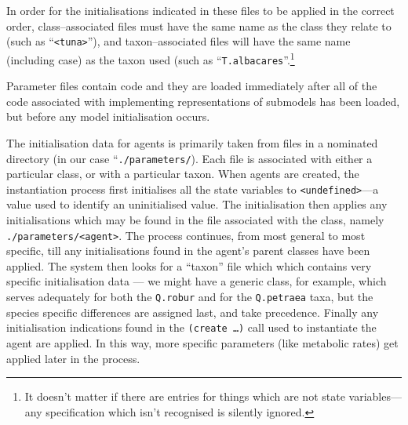 In order for the initialisations indicated in these files to be
applied in the correct order, class--associated files must have the
same name as the class they relate to (such as ``\texttt{<tuna>}''),
and taxon--associated files will have the same name (including case)
as the taxon used (such as ``\texttt{T.albacares}''.\footnote{It
  doesn't matter if there are entries for things which are not state
  variables---any specification which isn't recognised is silently
  ignored.}

Parameter files contain \Scheme code and they are loaded
immediately after all of the code associated with implementing
representations of submodels has been loaded, but before any model
initialisation occurs. 

The initialisation data for agents is primarily taken from files in a
nominated directory (in our case ``\texttt{./parameters/}).  Each file
is associated with either a particular class, or with a particular
taxon.  When agents are created, the instantiation process first
initialises all the state variables to \texttt{<undefined>}---a value
used to identify an uninitialised value.  The initialisation then
applies any initialisations which may be found in the file associated
with the  class, namely \texttt{./parameters/<agent>}.
The process continues, from most general to most specific, till any 
initialisations found in the agent's parent classes have been
applied.  The system then looks for a ``taxon'' file which which
contains very specific initialisation data --- we might have a generic
 class, for example, which serves adequately for both the
\texttt{Q.robur} and for the \texttt{Q.petraea} taxa, but the species
specific differences are assigned last, and take precedence.  Finally any
initialisation indications found in the \texttt{(create \ldots)} call
used to instantiate the agent are applied.  In this way, more specific
parameters (like metabolic rates) get applied later in the process.

